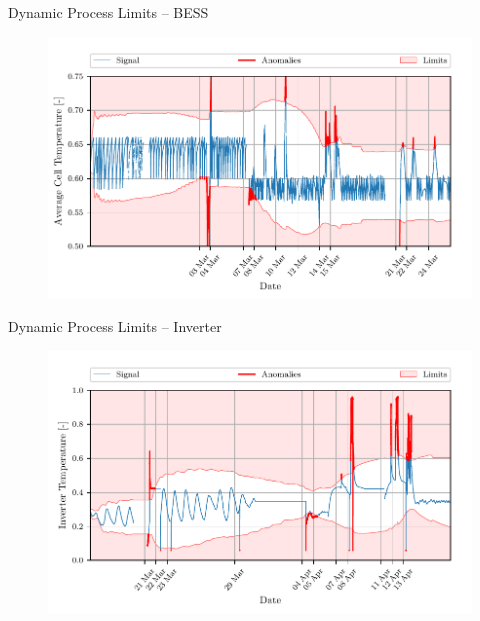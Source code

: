 \documentclass[aspectratio=169]{beamer}
\begin{document}
\begin{frame}{Dynamic Process Limits -- BESS}
    \begin{figure}[htpb]
        \begin{center}
            \includegraphics[width=0.78\linewidth]{../ilustrate/pc2023/bess/Average_Cell_Temperature_sliding_thresh.pdf}
        \end{center}
    \end{figure}
\end{frame}

\begin{frame}{Dynamic Process Limits -- Inverter}
    \begin{figure}[htpb]
        \begin{center}
            \includegraphics[width=0.78\linewidth]{../ilustrate/pc2023/inverter/inverter_thresh.pdf}
        \end{center}
    \end{figure}
\end{frame}
\end{document}
